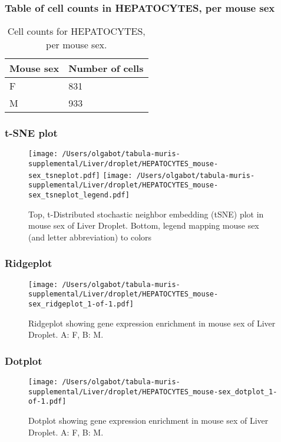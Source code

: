 \subsubsection{Table of cell counts in HEPATOCYTES, per mouse sex}\begin{table}[h]
\centering
\label{my-label}
\begin{tabular}{@{}ll@{}}
\toprule

Mouse sex& Number of cells \\ \midrule
F & 831 \\

M & 933 \\
\bottomrule
\end{tabular}
\caption{Cell counts for HEPATOCYTES, per mouse sex.}
\end{table}

\newpage
\subsubsection{t-SNE plot}
\begin{figure}[h]
\centering
\texttt{[image: /Users/olgabot/tabula-muris-supplemental/Liver/droplet/HEPATOCYTES\_mouse-sex\_tsneplot.pdf]}
\texttt{[image: /Users/olgabot/tabula-muris-supplemental/Liver/droplet/HEPATOCYTES\_mouse-sex\_tsneplot\_legend.pdf]}
\caption{Top, t-Distributed stochastic neighbor embedding (tSNE) plot  in mouse sex of Liver Droplet. Bottom, legend mapping mouse sex (and letter abbreviation) to colors}
\end{figure}


\newpage
\newpage
\subsubsection{Ridgeplot}
\begin{figure}[h]
\centering
\texttt{[image: /Users/olgabot/tabula-muris-supplemental/Liver/droplet/HEPATOCYTES\_mouse-sex\_ridgeplot\_1-of-1.pdf]}

\caption{ Ridgeplot  showing gene expression enrichment in mouse sex of Liver Droplet. A: F, B: M.}
\end{figure}


\newpage
\newpage
\subsubsection{Dotplot}
\begin{figure}[h]
\centering
\texttt{[image: /Users/olgabot/tabula-muris-supplemental/Liver/droplet/HEPATOCYTES\_mouse-sex\_dotplot\_1-of-1.pdf]}

\caption{ Dotplot  showing gene expression enrichment in mouse sex of Liver Droplet. A: F, B: M.}
\end{figure}

